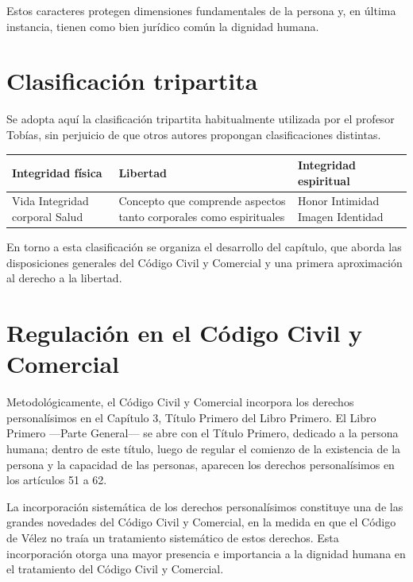 \documentclass[12pt,oneside]{book}
\begin{document}
\begin{important}
Estos caracteres protegen dimensiones fundamentales de la persona y, en última instancia, tienen como bien jurídico común la dignidad humana.
\end{important}

\section{Clasificación tripartita}

Se adopta aquí la clasificación tripartita habitualmente utilizada por el profesor Tobías, sin perjuicio de que otros autores propongan clasificaciones distintas.

\begin{table}[H]
\centering
\begin{tabular}{p{} p{} p{}}
\toprule
\textbf{Integridad física} & \textbf{Libertad} & \textbf{Integridad espiritual} \\
\midrule
Vida \newline Integridad corporal \newline Salud &
Concepto que comprende aspectos tanto corporales como espirituales &
Honor \newline Intimidad \newline Imagen \newline Identidad \\
\bottomrule
\end{tabular}
\end{table}

En torno a esta clasificación se organiza el desarrollo del capítulo, que aborda las disposiciones generales del Código Civil y Comercial y una primera aproximación al derecho a la libertad.

\section{Regulación en el Código Civil y Comercial}

Metodológicamente, el Código Civil y Comercial incorpora los derechos personalísimos en el Capítulo 3, Título Primero del Libro Primero. El Libro Primero —Parte General— se abre con el Título Primero, dedicado a la persona humana; dentro de este título, luego de regular el comienzo de la existencia de la persona y la capacidad de las personas, aparecen los derechos personalísimos en los artículos 51 a 62.

\begin{important}
La incorporación sistemática de los derechos personalísimos constituye una de las grandes novedades del Código Civil y Comercial, en la medida en que el Código de Vélez no traía un tratamiento sistemático de estos derechos. Esta incorporación otorga una mayor presencia e importancia a la dignidad humana en el tratamiento del Código Civil y Comercial.
\end{important}
\end{document}
